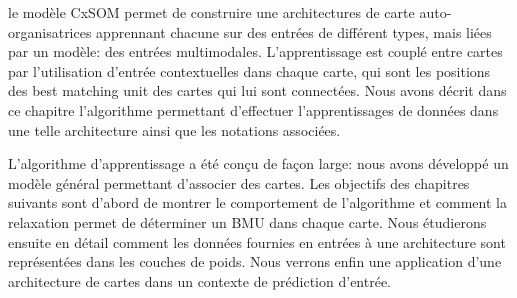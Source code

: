 le modèle CxSOM permet de construire une architectures de carte auto-organisatrices apprennant chacune sur des entrées de différent types, mais liées par un modèle: des entrées multimodales. L'apprentissage est couplé entre cartes par l'utilisation d'entrée contextuelles dans chaque carte, qui sont les positions des best matching unit des cartes qui lui sont connectées. Nous avons décrit dans ce chapitre l'algorithme permettant d'effectuer l'apprentissages de données dans une telle architecture ainsi que les notations associées. 

L'algorithme d'apprentissage a été conçu de façon large: nous avons développé un modèle général permettant d'associer des cartes. Les objectifs des chapitres suivants sont d'abord de montrer le comportement de l'algorithme et comment la relaxation permet de déterminer un BMU dans chaque carte. Nous étudierons ensuite en détail comment les données fournies en entrées à une architecture sont représentées dans les couches de poids. Nous verrons enfin une application d'une architecture de cartes dans un contexte de prédiction d'entrée.
